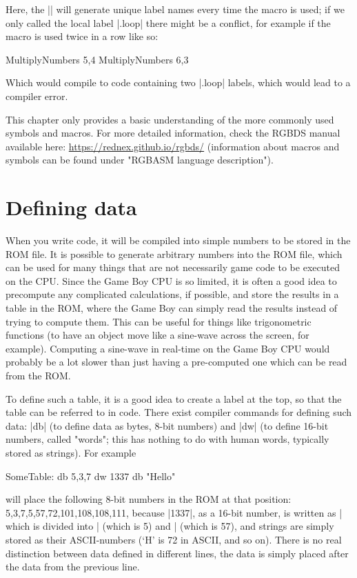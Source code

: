 \documentclass[11pt]{book}
\begin{document}
Here, the |\@| will generate unique label names every time the macro is used; if we only called the local label |.loop| there might be a conflict, for example if the macro is used twice in a row like so:

\begin{code}
MultiplyNumbers 5,4
MultiplyNumbers 6,3
\end{code}

Which would compile to code containing two |.loop| labels, which would lead to a compiler error.    

This chapter only provides a basic understanding of the more commonly used symbols and macros. For more detailed information, check the RGBDS manual available here: \url{https://rednex.github.io/rgbds/} (information about macros and symbols can be found under "RGBASM language description").

\section{Defining data}
\label{defdata}
When you write code, it will be compiled into simple numbers to be stored in the ROM file. It is possible to generate arbitrary numbers into the ROM file, which can be used for many things that are not necessarily game code to be executed on the CPU. Since the Game Boy CPU is so limited, it is often a good idea to precompute any complicated calculations, if possible, and store the results in a table in the ROM, where the Game Boy can simply read the results instead of trying to compute them. This can be useful for things like trigonometric functions (to have an object move like a sine-wave across the screen, for example). Computing a sine-wave in real-time on the Game Boy CPU would probably be a lot slower than just having a pre-computed one which can be read from the ROM.

To define such a table, it is a good idea to create a label at the top, so that the table can be referred to in code. There exist compiler commands for defining such data: |db| (to define data as bytes, 8-bit numbers) and |dw| (to define 16-bit numbers, called "words"; this has nothing to do with human words, typically stored as strings). For example

\begin{code}
SomeTable:
   db 5,3,7
   dw 1337
   db "Hello"
\end{code}

will place the following 8-bit numbers in the ROM at that position: 5,3,7,5,57,72,101,108,108,111, because |1337|, as a 16-bit number, is written as |%
which is divided into |%
(which is 5) and |%
(which is 57), and strings are simply stored as their ASCII-numbers (‘H’ is 72 in ASCII, and so on). There is no real distinction between data defined in different lines, the data is simply placed after the data from the previous line.
\end{document}
